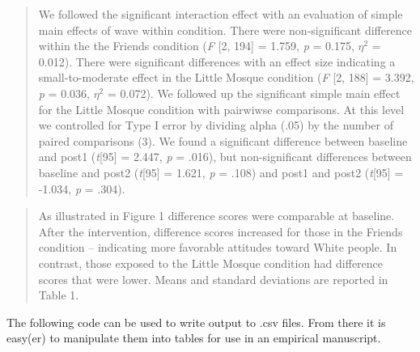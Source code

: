 \documentclass[
  11pt,
]{book}
\newenvironment{Shaded}{\begin{snugshade}}{\end{snugshade}}
\newcommand{\AttributeTok}[1]{\textcolor[rgb]{0.77,0.63,0.00}{#1}}
\newcommand{\CommentTok}[1]{\textcolor[rgb]{0.56,0.35,0.01}{\textit{#1}}}
\newcommand{\FunctionTok}[1]{\textcolor[rgb]{0.00,0.00,0.00}{#1}}
\newcommand{\NormalTok}[1]{#1}
\newcommand{\SpecialCharTok}[1]{\textcolor[rgb]{0.00,0.00,0.00}{#1}}
\newcommand{\StringTok}[1]{\textcolor[rgb]{0.31,0.60,0.02}{#1}}
\begin{document}
\begin{quote}
We followed the significant interaction effect with an evaluation of simple main effects of wave within condition. There were non-significant difference within the the Friends condition (\emph{F} {[}2, 194{]} = 1.759, \emph{p} = 0.175, \(\eta^{2}\) = 0.012). There were significant differences with an effect size indicating a small-to-moderate effect in the Little Mosque condition (\emph{F} {[}2, 188{]} = 3.392, \emph{p} = 0.036, \(\eta^{2}\) = 0.072). We followed up the significant simple main effect for the Little Mosque condition with pairwiwse comparisons. At this level we controlled for Type I error by dividing alpha (.05) by the number of paired comparisons (3). We found a significant difference between baseline and post1 (\emph{t}{[}95{]} = 2.447, \emph{p} = .016), but non-significant differences between baseline and post2 (\emph{t}{[}95{]} = 1.621, \emph{p} = .108) and post1 and post2 (\emph{t}{[}95{]} = -1.034, \emph{p} = .304).
\end{quote}

\begin{quote}
As illustrated in Figure 1 difference scores were comparable at baseline. After the intervention, difference scores increased for those in the Friends condition -- indicating more favorable attitudes toward White people. In contrast, those exposed to the Little Mosque condition had difference scores that were lower. Means and standard deviations are reported in Table 1.
\end{quote}

The following code can be used to write output to .csv files. From there it is easy(er) to manipulate them into tables for use in an empirical manuscript.

\begin{Shaded}
\end{Shaded}
\end{document}
